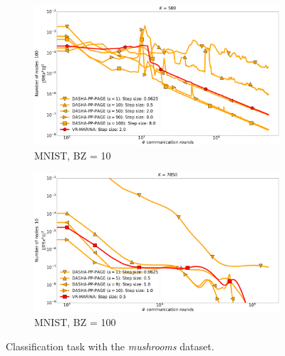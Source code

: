 \documentclass[12pt]{article}
\begin{document}
\begin{figure}[H]
    \begin{subfigure}{.5\textwidth}
        \includegraphics[width=\textwidth]{neurips_2022_finite_sum_real-sim_nof_500_numnodes_100_more_probs_batch_size_1.pdf}
        \caption{MNIST, BZ = 10}
    \end{subfigure}
    \begin{subfigure}{.5\textwidth}
        \includegraphics[width=\textwidth]{neurips_2022_finite_sum_mnist_nof_7850_numnodes_10_more_probs_batch_size_100_split_by_labels_logistic.pdf}
        \caption{MNIST, BZ = 100}
    \end{subfigure}
\caption{Classification task with the \textit{mushrooms} dataset.}
\label{fig:finite-sum}
\end{figure}

\end{document}
